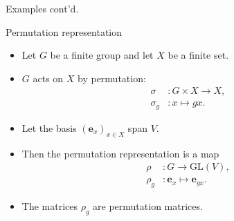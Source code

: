 \documentclass[handout, 10pt]{beamer}
\newcommand{\GL}{\text{GL}}
\newcommand{\bas}{\mathbf{e}}
\begin{document}
	\begin{frame}{Examples cont'd.}
		\begin{block}{Permutation representation}
			\begin{itemize}
				\item Let $G$ be a finite group and let $X$ be a finite set.
				
				\item $G$ acts on $X$ by permutation:
				\begin{align*}
					\sigma &: G \times X \rightarrow X, \\
					\sigma_g &: x \mapsto gx.
				\end{align*}
				
				\item Let the basis $(\bas_x)_{x \in X}$ span $V$.
				
				\item Then the permutation representation is a map
				\begin{align*}
					\rho &: G \rightarrow \GL(V), \\
					\rho_g &: \bas_x \mapsto \bas_{gx}.
				\end{align*}
				
				\item The matrices $\rho_g$ are \alert{permutation matrices}.
			\end{itemize}
		\end{block}
	\end{frame}
	
\end{document}

